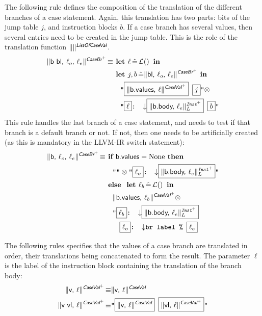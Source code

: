 \documentclass{llncs}
\newcommand{\trad}[2]{\ensuremath{\lVert \textsf{#1} \rVert^{\textit{#2}}}}
\newcommand{\nl}[0]{\ensuremath{\downarrow}}
\DeclareMathOperator{\isdef}{\equiv}
\DeclareMathOperator{\lbl}{\mathcal{L}()}
\newcommand{\llvm}[1]{\texttt{#1}}
\newcommand{\B}[1]{\textsf{#1}}
\newcommand{\ListOf}[1]{$\mbox{#1}^+$}
\newcommand{\IF}[0]{\textbf{ if }}
\newcommand{\ELSE}[0]{\textbf{ else }}
\newcommand{\THEN}[0]{\textbf{ then }}
\newcommand{\LET}[0]{\textbf{ let }}
\DeclareMathOperator{\BE}{\hat{=}}
\newcommand{\IN}[0]{\textbf{ in }}
\newcommand{\PH}[1]{\framebox{$#1$}}
\newcommand{\sep}[0]{\otimes}
\begin{document}
The following rule defines the composition of the translation of the different
branches of a case statement. Again, this translation has two parts: bits of the
jump table $j$, and instruction blocks $b$. If a case branch has several values,
then several entries need to be created in the jump table. This is the role
of the translation function $\trad{}{\B{ListOf{CaseVal}}}$.
\begin{align*}
  \trad{b bl, $\ell_o$, $\ell_e$}{\ListOf{\B{CaseBr}}} \isdef
  & \LET \ell \BE \lbl \IN \\
  & \LET j, b \BE \trad{bl, $\ell_o$, $\ell_e$}{\ListOf{\B{CaseBr}}} \IN \\
  & \quad \llvm{"\PH{\trad{b.values, $\ell$}{\ListOf{\B{CaseVal}}}} \PH{j}"}
  \sep \\
  & \quad
  \llvm{"\PH{\ell}: \nl \PH{\trad{b.body, $\ell_e$}{\ListOf{Inst}}_L} \PH{b}"}
\end{align*}
This rule handles the last branch of a case statement, and needs to test if
that branch is a default branch or not. If not, then one needs to be artificially
created (as this is mandatory in the LLVM-IR switch statement):
\begin{align*}
  \trad{b, $\ell_o$, $\ell_e$}{\ListOf{\B{CaseBr}}} \isdef
  & \IF \B{b.values} = \text{None} \THEN \\
  & \quad \llvm{""} \sep \llvm{"\PH{\ell_o}: \nl \PH{\trad{b.body, $\ell_e$}{\ListOf{Inst}}_L}"} \\
  & \ELSE \LET \ell_b \BE \lbl \IN \\
  & \quad \trad{b.values, $\ell_b$}{\ListOf{\B{CaseVal}}} \sep \\
  & \quad \llvm{"\PH{\ell_b}: \nl \PH{\trad{b.body, $\ell_e$}{\ListOf{Inst}}_L}} \\
  & \quad \quad \llvm{\PH{\ell_o}: \nl br label \% \PH{\ell_e}}
\end{align*}

The following rules specifies that the values of a case branch are translated in
order, their translations being concatenated to form the result. The parameter
$\ell$ is the label of the instruction block containing the translation of the
branch body:
\begin{align*}
  \trad{v, $\ell$}{\ListOf{\B{CaseVal}}} \isdef & \trad{v, $\ell$}{\B{CaseVal}} \\
  \trad{v vl, $\ell$}{\ListOf{\B{CaseVal}}} \isdef &
  \llvm{"\PH{\trad{v, $\ell$}{\B{CaseVal}}} \PH{\trad{vl, $\ell$}{\ListOf{\B{CaseVal}}}}"}
\end{align*}
\end{document}
